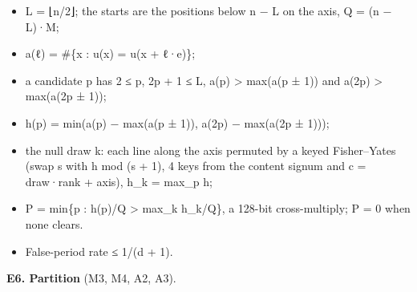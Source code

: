 \begin{itemize}
\begin{itemize}
\item L = ⌊n/2⌋; the starts are the positions below n − L on the axis, Q = (n − L)·M;
\item a(ℓ) = \#\{x : u(x) = u(x + ℓ·e)\};
\item a candidate p has 2 ≤ p, 2p + 1 ≤ L, a(p) > max(a(p ± 1)) and a(2p) > max(a(2p ± 1));
\item h(p) = min(a(p) − max(a(p ± 1)), a(2p) − max(a(2p ± 1)));
\item the null draw k: each line along the axis permuted by a keyed Fisher–Yates (swap s with h mod (s + 1), 4 keys from the content signum and c = draw·rank + axis), h\_\allowbreak{}k = max\_\allowbreak{}p h;
\item P = min\{p : h(p)/Q > max\_\allowbreak{}k h\_\allowbreak{}k/Q\}, a 128-bit cross-multiply; P = 0 when none clears.
\item False-period rate ≤ 1/(d + 1).
\end{itemize}
\end{itemize}

\textbf{E6. Partition} (M3, M4, A2, A3).

